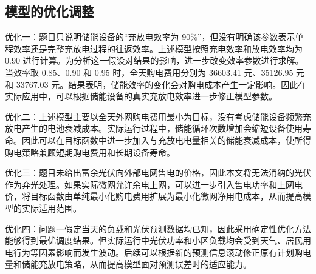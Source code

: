 \subsection{模型的优化调整}

优化一：题目只说明储能设备的“充放电效率为 90\%”，但没有明确该参数表示单程效率还是完整充放电过程的往返效率。上述模型按照充电效率和放电效率均为 0.90 进行计算。为分析这一假设对结果的影响，进一步改变效率参数进行求解。当效率取 0.85、0.90 和 0.95 时，全天购电费用分别为 36603.41 元、35126.95 元和 33767.03 元。结果表明，储能效率的变化会对购电成本产生一定影响。因此在实际应用中，可以根据储能设备的真实充放电效率进一步修正模型参数。

优化二：上述模型主要以全天外网购电费用最小为目标，没有考虑储能设备频繁充放电产生的电池衰减成本。实际运行过程中，储能循环次数增加会缩短设备使用寿命。因此可以在目标函数中进一步加入与充放电电量相关的储能衰减成本，使所得购电策略兼顾短期购电费用和长期设备寿命。

优化三：题目未给出富余光伏向外部电网售电的价格，因此本文将无法消纳的光伏作为弃光处理。如果实际微网允许余电上网，可以进一步引入售电功率和上网电价，将目标函数由单纯最小化购电费用扩展为最小化微网净用电成本，从而提高模型的实际适用范围。

优化四：问题一假定当天的负载和光伏预测数据均已知，因此采用确定性优化方法能够得到最优调度结果。但实际运行中光伏功率和小区负载均会受到天气、居民用电行为等因素影响而发生波动。后续可以根据新的预测信息滚动修正原有计划购电量和储能充放电策略，从而提高模型面对预测误差时的适应能力。
